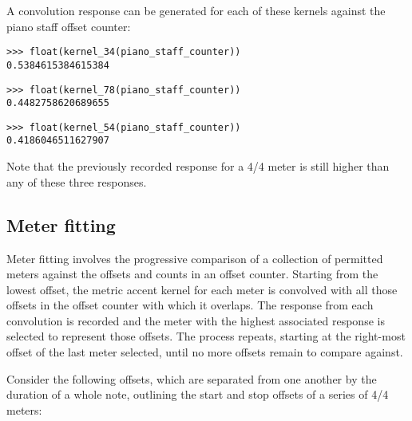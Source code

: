 \noindent A convolution response can be generated for each of these kernels
against the piano staff offset counter:

\begin{comment}
<abjad>
float(kernel_34(piano_staff_counter))
float(kernel_78(piano_staff_counter))
float(kernel_54(piano_staff_counter))
</abjad>
\end{comment}

\begin{abjadbookoutput}
\begin{singlespacing}
\vspace{-0.5\baselineskip}
\begin{lstlisting}
>>> float(kernel_34(piano_staff_counter))
0.5384615384615384
\end{lstlisting}
\begin{lstlisting}
>>> float(kernel_78(piano_staff_counter))
0.4482758620689655
\end{lstlisting}
\begin{lstlisting}
>>> float(kernel_54(piano_staff_counter))
0.4186046511627907
\end{lstlisting}
\end{singlespacing}
\end{abjadbookoutput}

\noindent Note that the previously recorded response for a 4/4 meter is still
higher than any of these three responses.

\subsection{Meter fitting} %

Meter fitting involves the progressive comparison of a collection of permitted
meters against the offsets and counts in an offset counter. Starting from the
lowest offset, the metric accent kernel for each meter is convolved with all
those offsets in the offset counter with which it overlaps. The response from
each convolution is recorded and the meter with the highest associated response
is selected to represent those offsets. The process repeats, starting at the
right-most offset of the last meter selected, until no more offsets remain to
compare against.

Consider the following offsets, which are separated from one another by the
duration of a whole note, outlining the start and stop offsets of a series of
4/4 meters:

\begin{comment}
<abjad>
offset_counter = metertools.OffsetCounter([
    (0, 4), (4, 4), (8, 4), (12, 4), (16, 4),
    ])
show(offset_counter, range_=(0, 5))
</abjad>
\end{comment}

